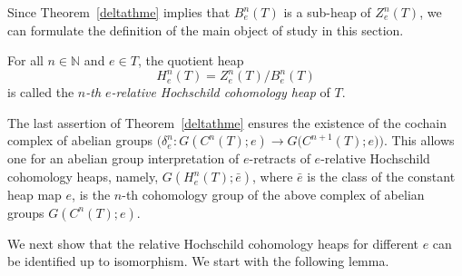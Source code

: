 \documentclass[10pt,a4paper]{amsart}
\numberwithin{equation}{section}
\newcommand{\N}{\mathbb N}
\begin{document}
Since Theorem~\ref{deltathme} implies that $B^n_e(T)$ is a sub-heap of $Z^n_e(T)$, we can formulate the definition of the main object of study in this section.
\begin{Definition}\label{quotient.def}
For all $n\in \N$ and $e\in T$, the quotient heap
\[ H^n_e(T) = Z^n_e(T)/B^n_e(T)
\]
is called the {\em $n$-th $e$-relative Hochschild cohomology heap} of $T$.
\end{Definition}

\begin{Remark}\label{rem.coh.gr}
 The last assertion of Theorem~\ref{deltathme} ensures the existence of the cochain complex of abelian groups $\big(\delta_e^n\colon G(C^n(T);e) \to G\big(C^{n+1}(T);e\big)\big)$. This allows one for an abelian group interpretation of $e$-retracts of $e$-relative Hochschild cohomology heaps, namely, $G(H^n_e(T);\bar{e})$, where $\bar{e}$ is the class of the constant heap map $e$, is the $n$-th cohomology group of the above complex of abelian groups $G(C^n(T);e)$.
\end{Remark}
We next show that the relative Hochschild cohomology heaps for different $e$ can be identified up to isomorphism. We start with the following lemma.
\end{document}
